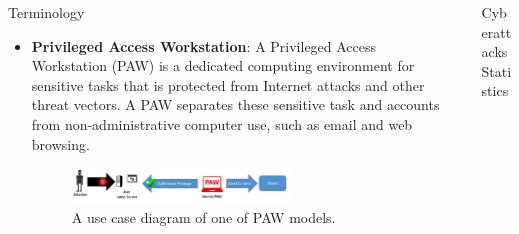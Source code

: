 \documentclass[final]{beamer}
\newlength{\sepwidth}
\newlength{\colwidth}
\newcommand{\separatorcolumn}{\begin{column}{\sepwidth}\end{column}}
\begin{document}
\begin{frame}[t]
\begin{columns}[t]
\begin{column}{\colwidth}
\begin{alertblock}{Terminology}
\begin{itemize}
      \item \textbf{Privileged Access Workstation}: A Privileged Access Workstation (PAW) is a dedicated computing environment for sensitive tasks that is protected from Internet attacks and other threat vectors. A PAW separates these sensitive task and accounts from non-administrative computer use, such as email and web browsing.
      \begin{figure}[h!]
        \includegraphics[width=0.67\textwidth]{PAW.png}
        \caption{A use case diagram of one of PAW models.}
      \end{figure}
    \end{itemize}

   

  \end{alertblock}
  
  

\end{column}




\separatorcolumn
\begin{column}{\colwidth}

  \begin{block}{Cyberattacks Statistics}
      

\end{block}
\end{column}
\end{columns}
\end{frame}
\end{document}
